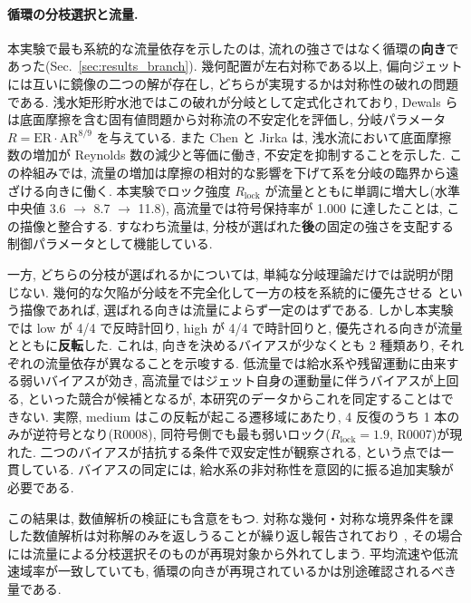 \paragraph{循環の分枝選択と流量.}
本実験で最も系統的な流量依存を示したのは, 流れの強さではなく循環の\textbf{向き}であった(Sec.~\ref{sec:results_branch}). 幾何配置が左右対称である以上, 偏向ジェットには互いに鏡像の二つの解が存在し, どちらが実現するかは対称性の破れの問題である. 浅水矩形貯水池ではこの破れが分岐として定式化されており, Dewals ら \cite{dewalsExperimentalNumericalAnalysis2008} は底面摩擦を含む固有値問題から対称流の不安定化を評価し, 分岐パラメータ $R = \mathrm{ER}\cdot\mathrm{AR}^{8/9}$ を与えている. また Chen と Jirka \cite{chenAbsoluteConvectiveInstabilities1997} は, 浅水流において底面摩擦数の増加が Reynolds 数の減少と等価に働き, 不安定を抑制することを示した. この枠組みでは, 流量の増加は摩擦の相対的な影響を下げて系を分岐の臨界から遠ざける向きに働く. 本実験でロック強度 $R_{\mathrm{lock}}$ が流量とともに単調に増大し(水準中央値 3.6 $\to$ 8.7 $\to$ 11.8), 高流量では符号保持率が 1.000 に達したことは, この描像と整合する. すなわち流量は, 分枝が選ばれた\textbf{後}の固定の強さを支配する制御パラメータとして機能している.

一方, どちらの分枝が選ばれるかについては, 単純な分岐理論だけでは説明が閉じない. 幾何的な欠陥が分岐を不完全化して一方の枝を系統的に優先させる \cite{mullinFlowSymmetricChannel2003} という描像であれば, 選ばれる向きは流量によらず一定のはずである. しかし本実験では low が 4/4 で反時計回り, high が 4/4 で時計回りと, 優先される向きが流量とともに\textbf{反転}した. これは, 向きを決めるバイアスが少なくとも 2 種類あり, それぞれの流量依存が異なることを示唆する. 低流量では給水系や残留運動に由来する弱いバイアスが効き, 高流量ではジェット自身の運動量に伴うバイアスが上回る, といった競合が候補となるが, 本研究のデータからこれを同定することはできない. 実際, medium はこの反転が起こる遷移域にあたり, 4 反復のうち 1 本のみが逆符号となり(R0008), 同符号側でも最も弱いロック($R_{\mathrm{lock}} = 1.9$, R0007)が現れた. 二つのバイアスが拮抗する条件で双安定性が観察される, という点では一貫している. バイアスの同定には, 給水系の非対称性を意図的に振る追加実験が必要である.

この結果は, 数値解析の検証にも含意をもつ. 対称な幾何・対称な境界条件を課した数値解析は対称解のみを返しうることが繰り返し報告されており \cite{constantinescuNumericalModelSimulation1998,kantoushFLOWSHALLOWRECTANGULAR2008,dufresneNumericalInvestigationFlow2011}, その場合には流量による分枝選択そのものが再現対象から外れてしまう. 平均流速や低流速域率が一致していても, 循環の向きが再現されているかは別途確認されるべき量である.

